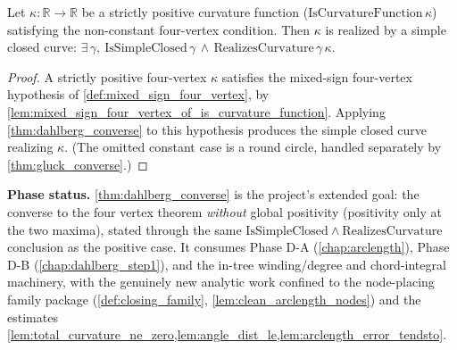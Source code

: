 \begin{theorem}

  \label{thm:gluck_converse_nonconstant}
  Let $\kappa:\mathbb{R}\to\mathbb{R}$ be a strictly positive curvature function
  ($\mathrm{IsCurvatureFunction}\,\kappa$) satisfying the non-constant four-vertex
  condition. Then $\kappa$ is realized by a simple closed curve:
  $\exists\,\gamma,\ \mathrm{IsSimpleClosed}\,\gamma\,\wedge\,
       \mathrm{RealizesCurvature}\,\gamma\,\kappa$.
\end{theorem}
\begin{proof}
  \leanok
  A strictly positive four-vertex $\kappa$ satisfies the mixed-sign four-vertex
  hypothesis of \cref{def:mixed_sign_four_vertex}, by
  \cref{lem:mixed_sign_four_vertex_of_is_curvature_function}. Applying
  \cref{thm:dahlberg_converse} to this hypothesis produces the simple closed curve
  realizing $\kappa$. (The omitted constant case is a round circle, handled
  separately by \cref{thm:gluck_converse}.)
\end{proof}

\noindent\textbf{Phase status.} \cref{thm:dahlberg_converse} is the project's
extended goal: the converse to the four vertex theorem \emph{without} global
positivity (positivity only at the two maxima), stated through the same
$\mathrm{IsSimpleClosed}\wedge\mathrm{RealizesCurvature}$ conclusion as the positive
case. It consumes Phase D-A (\cref{chap:arclength}), Phase D-B
(\cref{chap:dahlberg_step1}), and the in-tree winding/degree and chord-integral
machinery, with the genuinely new analytic work confined to the node-placing family
package (\cref{def:closing_family}, \cref{lem:clean_arclength_nodes}) and the
estimates \cref{lem:total_curvature_ne_zero,lem:angle_dist_le,lem:arclength_error_tendsto}.
